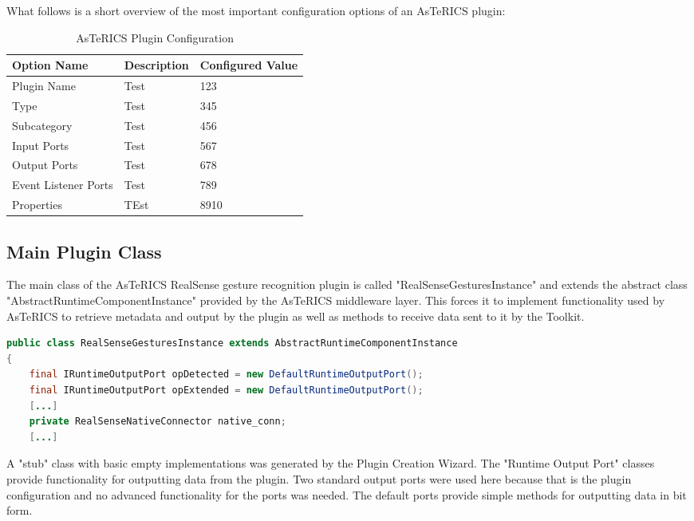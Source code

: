 \documentclass[BSA,Bachelor,english]{twbook}%
\begin{document}
What follows is a short overview of the most important configuration options of an AsTeRICS plugin:
\begin{table}[]
	\centering
	\caption{AsTeRICS Plugin Configuration}
	\label{plugin-config}
\begin{tabular}{|l|l|l|}
	\hline
	Option Name          & Description & Configured Value \\ \hline
	Plugin Name          & Test        & 123              \\ \hline
	Type                 & Test        & 345              \\ \hline
	Subcategory          & Test        & 456              \\ \hline
	Input Ports          & Test        & 567              \\ \hline
	Output Ports         & Test        & 678              \\ \hline
	Event Listener Ports & Test        & 789              \\ \hline
	Properties           & TEst        & 8910             \\ \hline
\end{tabular}
\end{table}

\subsection{Main Plugin Class}

The main class of the AsTeRICS RealSense gesture recognition plugin is called "RealSenseGesturesInstance" and extends the abstract class "AbstractRuntimeComponentInstance" provided by the AsTeRICS middleware layer. This forces it to implement functionality used by AsTeRICS to retrieve metadata and output by the plugin as well as methods to receive data sent to it by the Toolkit.

\begin{lstlisting}[language=Java,name={Main plugin class and member variables},label={rs:javaplugin:1}]
public class RealSenseGesturesInstance extends AbstractRuntimeComponentInstance
{
	final IRuntimeOutputPort opDetected = new DefaultRuntimeOutputPort();
	final IRuntimeOutputPort opExtended = new DefaultRuntimeOutputPort();
	[...]
	private RealSenseNativeConnector native_conn;
	[...]
\end{lstlisting}

A "stub" class with basic empty implementations was generated by the Plugin Creation Wizard. The "Runtime Output Port" classes provide functionality for outputting data from the plugin. Two standard output ports were used here because that is the plugin configuration and no advanced functionality for the ports was needed. The default ports provide simple methods for outputting data in bit form.
\end{document}
